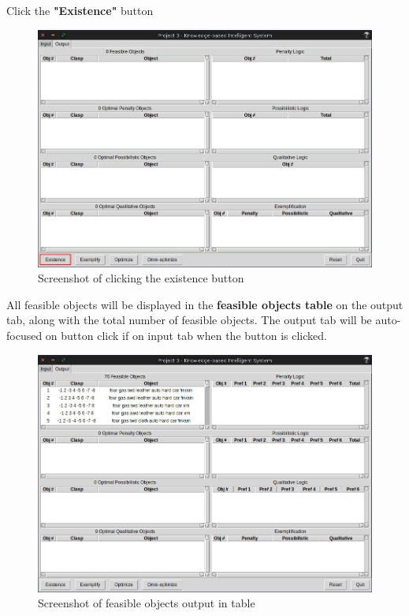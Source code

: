 \documentclass[12pt]{report}
\begin{document}
\begin{description}[leftmargin=4em]
\item [Step 1:] Click the \textbf{"Existence"} button
\begin{figure}[H]
\begin{center}
\includegraphics[scale=0.3,trim=1cm 1cm 1cm 1cm]{existence}
\caption{Screenshot of clicking the existence button}
\end{center}
\end{figure}
\vspace{-2.5em}
\item [Result:] All feasible objects will be displayed in the \textbf{feasible objects table} on the output tab, along with the total number of feasible objects. The output tab will be auto-focused on button click if on input tab when the button is clicked.
\begin{figure}[H]
\begin{center}
\includegraphics[scale=0.3,trim=1cm 1cm 1cm 1cm]{post_existence}
\caption{Screenshot of feasible objects output in table}
\end{center}
\end{figure}
\vspace{-2.5em}
\end{description}
\end{document}

